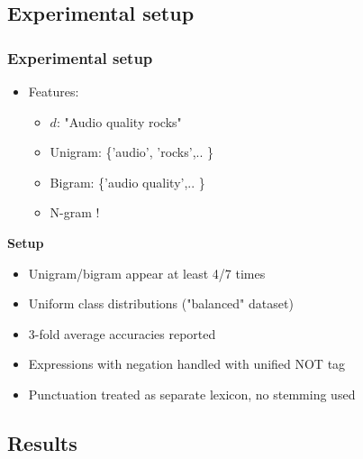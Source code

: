 \documentclass{beamer}
\begin{document}
\subsection{Experimental setup}
\begin{frame}
	\frametitle{Experimental setup}
\begin{itemize}	
	\item Features:
	\begin{itemize}
		\item $d$: "Audio quality rocks"
		\item Unigram: \{'audio', 'rocks',..  \}
		\item Bigram: \{'audio quality',.. \}
		\item N-gram !
	\end{itemize}
\end{itemize}

\textbf{Setup}
\begin{itemize}
	\item Unigram/bigram appear at least 4/7 times
	\item Uniform class distributions ("balanced" dataset)
	\item 3-fold average accuracies reported
	\item Expressions with negation handled with unified NOT tag
	\item Punctuation treated as separate lexicon, no stemming used
\end{itemize}
\end{frame}

\subsection{Results}
\end{document}

